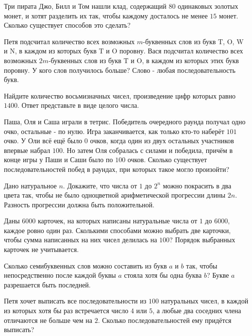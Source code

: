 \begin{problems}
\item Три пирата Джо, Билл и Том нашли клад, содержащий $80$ одинаковых золотых монет, и хотят разделить их так, чтобы каждому досталось не менее $15$ монет. Сколько существует способов это сделать?

\item Петя подсчитал количество всех возможных $m$-буквенных слов из букв $\mathrm{T}$, $\mathrm{O}$, $\mathrm{W}$ и $\mathrm{N}$, в каждом из которых букв $\mathrm{T}$ и $\mathrm{O}$ поровну. Вася подсчитал количество всех возможных $2m$-буквенных слов из букв $\mathrm{T}$ и $\mathrm{O}$, в каждом из которых этих букв поровну. У кого слов получилось больше? Слово - любая последовательность букв.

\item Найдите количество восьмизначных чисел, произведение цифр которых равно $1400$. Ответ представьте в виде целого числа.

\item Паша, Оля и Саша играли в тетрис. Победитель очередного раунда получал одно очко, остальные - по нулю. Игра заканчивается, как только кто-то наберёт $101$ очко. У Оли всё ещё было $0$ очков, когда один из двух остальных участников впервые набрал $100$. Но затем Оля собралась с силами и победила, причём в конце игры у Паши и Саши было по $100$ очков. Сколько существует последовательностей побед в раундах, при которых такое могло произойти?

\item Дано натуральное $n$. Докажите, что числа от $1$ до $2^n$ можно покрасить в два цвета так, чтобы не было одноцветной арифметической прогрессии длины $2n$. Разность прогрессии должна быть положительной.

\item Даны $6000$ карточек, на которых написаны натуральные числа от $1$ до $6000$, каждое ровно один раз. Сколькими способами можно выбрать две карточки, чтобы сумма написанных на них чисел делилась на $100$? Порядок выбранных карточек не учитывается.

\item Сколько семибуквенных слов можно составить из букв $a$ и $b$ так, чтобы непосредственно после каждой буквы $a$ стояла хотя бы одна буква $b$? Букве $a$ разрешается быть последней.

\item Петя хочет выписать все последовательности из $100$ натуральных чисел, в каждой из которых хотя бы раз встречается число $4$ или $5$, а любые два соседних члена отличаются не больше чем на $2$. Сколько последовательностей ему придётся выписать?


\end{problems}
